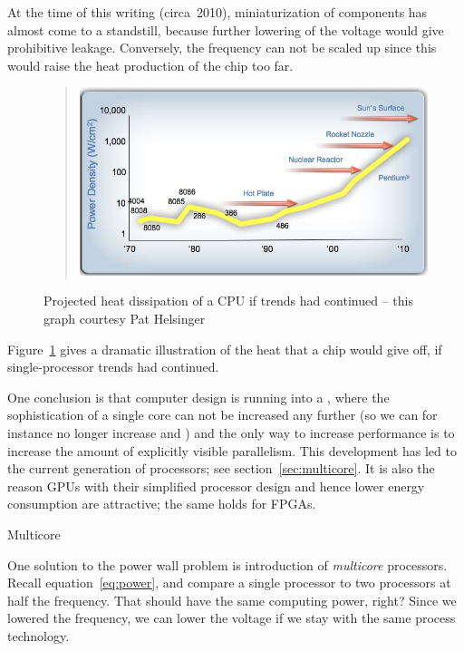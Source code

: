 At the time of this writing (circa~2010), miniaturization of
components has almost come to a standstill, because further lowering
of the voltage would give prohibitive leakage. Conversely, the
frequency can not be scaled up since this would raise the heat
production of the chip too far. 
%
\begin{figure}[ht]
  \begin{quote}
  \includegraphics[scale=.6]{graphics-public/chipheat0}
  \end{quote}
  \caption{Projected heat dissipation of a CPU if trends had
    continued -- this graph courtesy Pat Helsinger}
  \label{fig:chipheat}
\end{figure}
%
Figure~\ref{fig:chipheat} gives a dramatic illustration of the heat
that a chip would give off, if single-processor trends had
continued.

One conclusion is that computer design
is running into a , where the sophistication
of a single core can not be increased any further (so we can for
instance no longer increase  and
) and the only way to increase
performance is to increase the amount of explicitly visible
parallelism. This development has led to the current generation of
 processors; see section~\ref{sec:multicore}. It
is also the reason \acp{GPU} with their simplified processor design
and hence lower energy consumption
are attractive; the same holds for \acp{FPGA}.

 {Multicore}

One solution to the power wall problem is introduction
of \emph{multicore} processors.
Recall equation~\ref{eq:power}, and compare a single processor to two 
processors at half the frequency. That should have the same computing power, right?
Since we lowered the frequency, we can lower the voltage if we stay with the same 
process technology.

